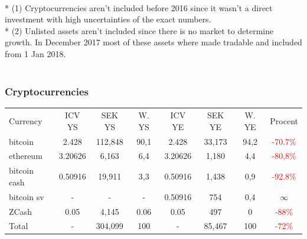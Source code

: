 \documentclass[a4paper]{article}
\begin{document}
 \\
* (1) Cryptocurrencies aren't included before 2016 since it wasn't a direct investment with high uncertainties of the exact numbers. \\
* (2) Unlisted assets aren't included since there is no market to determine growth. In December 2017 most of these assets where made tradable and included from 1 Jan 2018. \\
\\

\subsubsection{Cryptocurrencies}
\begin{tabular}{l|c|c|c|c|c|c|c}
	Currency & ICV YS & SEK YS & W. YS & ICV YE & SEK YE & W. YE & Procent \\
	bitcoin & 2.428 & 112,848 & 90,1 & 2.428 & 33,173 & 94,2 & \textcolor{red}{-70.7\%} \\
    ethereum & 3.20626 & 6,163 & 6,4 & 3.20626 & 1,180 & 4,4 & \textcolor{red}{-80,8\%} \\
    bitcoin cash & 0.50916 & 19,911 & 3,3 & 0.50916 & 1,438 & 0,9 & \textcolor{red}{-92.8\%} \\
    bitcoin sv & - & - & - & 0.50916 & 754 & 0,4 & $ \infty $ \\
    ZCash & 0.05 & 4,145 & 0.06 & 0.05 & 497 & 0 & \textcolor{red}{-88\%} \\
    Total & - & 304,099 & 100 & - & 85,467 & 100 & \textcolor{red}{-72\%} 
    \end{tabular}\\
\\
 
\end{document}
